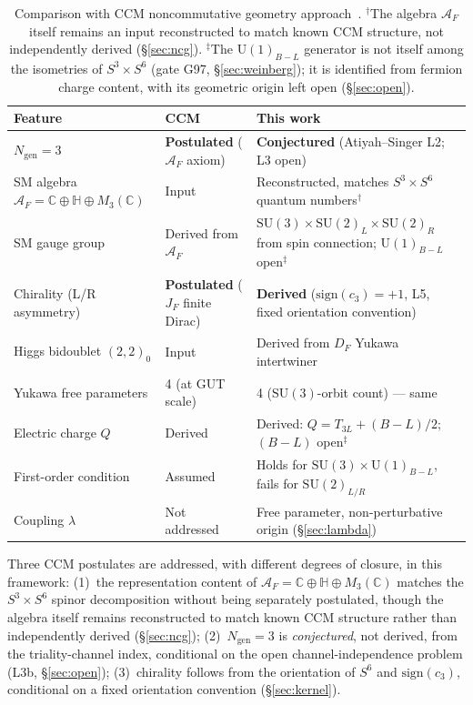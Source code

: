 \documentclass[12pt,a4paper]{article}
\newcommand{\CC}{\mathbb{C}}
\newcommand{\HH}{\mathbb{H}}
\begin{document}
\begin{table}[h]
\centering
\footnotesize
\renewcommand{\arraystretch}{1.3}
\begin{tabular}{@{}L{0.20\textwidth}L{0.22\textwidth}L{0.50\textwidth}@{}}
\toprule
Feature & CCM~\cite{CCM2006} & This work \\
\midrule
$N_{\mathrm{gen}}=3$ & \textbf{Postulated} ($\mathcal{A}_F$ axiom) & \textbf{Conjectured} (Atiyah--Singer L2; L3 open) \\
SM algebra $\mathcal{A}_F=\CC\oplus\HH\oplus M_3(\CC)$ & Input & Reconstructed, matches $S^3\times S^6$ quantum numbers$^\dagger$ \\
SM gauge group & Derived from $\mathcal{A}_F$ & $\mathrm{SU}(3)\times\mathrm{SU}(2)_L\times\mathrm{SU}(2)_R$ from spin connection; $\mathrm{U}(1)_{B-L}$ open$^\ddagger$ \\
Chirality (L/R asymmetry) & \textbf{Postulated} ($J_F$ finite Dirac) & \textbf{Derived} ($\mathrm{sign}(c_3)=+1$, L5, fixed orientation convention) \\
Higgs bidoublet $(2,2)_0$ & Input & Derived from $D_F$ Yukawa intertwiner \\
Yukawa free parameters & 4 (at GUT scale) & 4 ($\mathrm{SU}(3)$-orbit count) --- same \\
Electric charge $Q$ & Derived & Derived: $Q=T_{3L}+(B{-}L)/2$; $(B{-}L)$ open$^\ddagger$ \\
First-order condition & Assumed & Holds for $\mathrm{SU}(3)\times\mathrm{U}(1)_{B-L}$, fails for $\mathrm{SU}(2)_{L/R}$ \\
Coupling $\lambda$ & Not addressed & Free parameter, non-perturbative origin (\S\ref{sec:lambda}) \\
\bottomrule
\end{tabular}
\renewcommand{\arraystretch}{1.0}
\caption{Comparison with CCM noncommutative geometry approach~\cite{CCM2006}.
$^\dagger$The algebra $\mathcal{A}_F$ itself remains an input reconstructed to match
known CCM structure, not independently derived (\S\ref{sec:ncg}).
$^\ddagger$The $\mathrm{U}(1)_{B-L}$ generator is not itself among the isometries of
$S^3\times S^6$ (gate G97, \S\ref{sec:weinberg}); it is identified from fermion charge
content, with its geometric origin left open (\S\ref{sec:open}).}
\label{tab:ccm}
\end{table}

Three CCM postulates are addressed, with different degrees of closure, in this
framework: (1)~the representation content of $\mathcal{A}_F=\CC\oplus\HH\oplus M_3(\CC)$
matches the $S^3\times S^6$ spinor decomposition without being separately postulated,
though the algebra itself remains reconstructed to match known CCM structure rather
than independently derived (\S\ref{sec:ncg}); (2)~$N_{\mathrm{gen}}=3$ is
\emph{conjectured}, not derived, from the triality-channel index, conditional on the
open channel-independence problem (L3b, \S\ref{sec:open}); (3)~chirality follows from
the orientation of $S^6$ and $\mathrm{sign}(c_3)$, conditional on a fixed orientation
convention (\S\ref{sec:kernel}).
\end{document}
